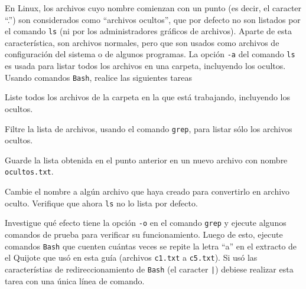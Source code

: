 \documentclass[11pt]{exam}
\begin{document}
\begin{questions}
\item En Linux, los archivos cuyo nombre comienzan con un punto (es decir, el caracter ``.'') son considerados como ``archivos ocultos'', que por defecto no son listados por el comando \texttt{ls} (ni por los administradores gráficos de archivos). Aparte de esta característica, son archivos normales, pero que son usados como archivos de configuración del sistema o de algunos programas. La opción \texttt{-a} del comando \texttt{ls} es usada para listar todos los archivos en una carpeta, incluyendo los ocultos. Usando comandos \texttt{Bash}, realice las siguientes tareas
\begin{parts}
\item Liste todos los archivos de la carpeta en la que está trabajando, incluyendo los ocultos.
\item Filtre la lista de archivos, usando el comando \texttt{grep}, para listar sólo los archivos ocultos.
\item Guarde la lista obtenida en el punto anterior en un nuevo archivo con nombre \texttt{ocultos.txt}.
\item Cambie el nombre a algún archivo que haya creado para convertirlo en archivo oculto. Verifique que ahora \texttt{ls} no lo lista por defecto.
\end{parts}

\item Investigue qué efecto tiene la opción \texttt{-o} en el comando \texttt{grep} y ejecute algunos comandos de prueba para verificar su funcionamiento. Luego de esto, ejecute comandos \texttt{Bash} que cuenten cuántas veces se repite la letra ``a'' en el extracto de el Quijote que usó en esta guía (archivos \texttt{c1.txt} a \texttt{c5.txt}). Si usó las característias de redireccionamiento de \texttt{Bash} (el caracter \texttt{|}) debiese realizar esta tarea con una única línea de comando.


\end{questions}
\end{document}
